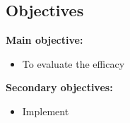 \subsection{Objectives}

\textbf{Main objective:}
\begin{itemize}
    \item To evaluate the efficacy 
\end{itemize}

\noindent \textbf{Secondary objectives:}
\begin{itemize}
    \item Implement 
\end{itemize}
